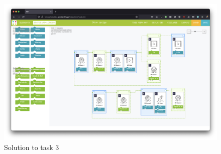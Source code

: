 \begin{figure}[h]
    \centering
    \includegraphics[width=\linewidth]{Figures/Evaluation/Tasks/task3-sol.png}
    \caption{Solution to task 3}
    \label{fig:task3-sol}
\end{figure}


